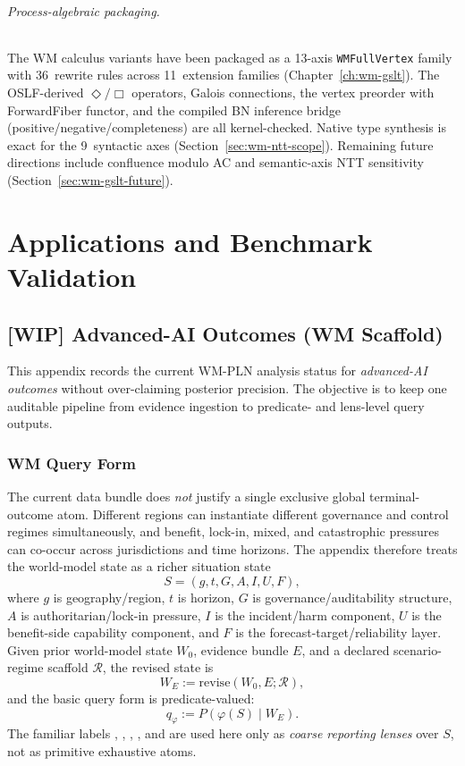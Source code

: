 \documentclass[11pt,openany]{report}
\begin{document}
\paragraph{Process-algebraic packaging.}
The WM calculus variants have been packaged as a 13-axis
\texttt{WMFullVertex} family with 36~rewrite rules across 11~extension
families (Chapter~\ref{ch:wm-gslt}).  The OSLF-derived $\Diamond/\Box$
operators, Galois connections, the vertex preorder with ForwardFiber
functor, and the compiled BN inference bridge (positive/negative/completeness)
are all kernel-checked.  Native type synthesis is exact for the 9~syntactic
axes (Section~\ref{sec:wm-ntt-scope}).  Remaining future directions
include confluence modulo AC and semantic-axis NTT sensitivity
(Section~\ref{sec:wm-gslt-future}).


\part{Applications and Benchmark Validation}
\label{part:applications}

\chapter{[WIP] Advanced-AI Outcomes (WM Scaffold)}
\label{app:ai-outcomes}

This appendix records the current WM-PLN analysis status for
\emph{advanced-AI outcomes} without over-claiming posterior precision.
The objective is to keep one auditable pipeline from evidence ingestion
to predicate- and lens-level query outputs.

\section{WM Query Form}

The current data bundle does \emph{not} justify a single exclusive
global terminal-outcome atom.  Different regions can instantiate
different governance and control regimes simultaneously, and benefit,
lock-in, mixed, and catastrophic pressures can co-occur across
jurisdictions and time horizons.  The appendix therefore treats the
world-model state as a richer situation state
\[
  S = (g, t, G, A, I, U, F),
\]
where $g$ is geography/region, $t$ is horizon, $G$ is
governance/auditability structure, $A$ is authoritarian/lock-in
pressure, $I$ is the incident/harm component, $U$ is the benefit-side
capability component, and $F$ is the forecast-target/reliability layer.
Given prior world-model state $W_0$, evidence bundle $E$, and a declared
scenario-regime scaffold $\mathcal{R}$, the revised state is
\[
  W_E := \mathrm{revise}(W_0, E; \mathcal{R}),
\]
and the basic query form is predicate-valued:
\[
  q_{\varphi} := P(\varphi(S) \mid W_E).
\]
The familiar labels
,
,
,
, and  are used here
only as \emph{coarse reporting lenses} over $S$, not as primitive
exhaustive atoms.
\end{document}
